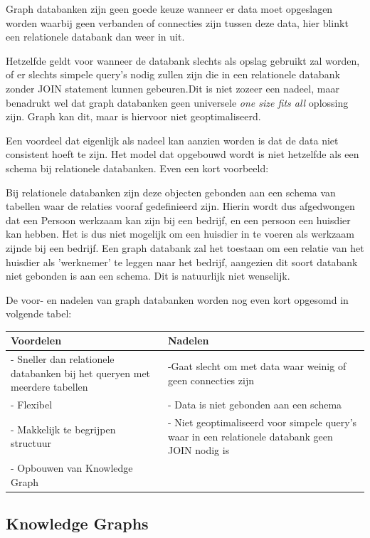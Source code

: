 Graph databanken zijn geen goede keuze wanneer er data moet opgeslagen worden waarbij geen verbanden of connecties zijn tussen deze data, hier blinkt een relationele databank dan weer in uit. 

Hetzelfde geldt voor wanneer de databank slechts als opslag gebruikt zal worden, of er slechts simpele query's nodig zullen zijn die in een relationele databank zonder JOIN statement kunnen gebeuren.Dit is niet zozeer een nadeel, maar benadrukt wel dat graph databanken geen universele \textit{one size fits all} oplossing zijn. Graph kan dit, maar is hiervoor niet geoptimaliseerd.

Een voordeel dat eigenlijk als nadeel kan aanzien worden is dat de data niet consistent hoeft te zijn. Het model dat opgebouwd wordt is niet hetzelfde als een schema bij relationele databanken. Even een kort voorbeeld:

Bij relationele databanken zijn deze objecten gebonden aan een schema van tabellen waar de relaties vooraf gedefinieerd zijn. Hierin wordt dus afgedwongen dat een Persoon werkzaam kan zijn bij een bedrijf, en een persoon een huisdier kan hebben. Het is dus niet mogelijk om een huisdier in te voeren als werkzaam zijnde bij een bedrijf.
Een graph databank zal het toestaan om een relatie van het huisdier als 'werknemer' te leggen naar het bedrijf, aangezien dit soort databank niet gebonden is aan een schema. Dit is natuurlijk niet wenselijk.

De voor- en nadelen van graph databanken worden nog even kort opgesomd in volgende tabel:

\begin{center}
	\begin{tabularx}{\textwidth}{|X|X|}
		\hline
		\textbf{Voordelen} & \textbf{Nadelen}  \\ 
		\hline
		 - Sneller dan relationele databanken bij het queryen met meerdere tabellen & -Gaat slecht om met data waar weinig of geen connecties zijn \\ 
		- Flexibel & - Data is niet gebonden aan een schema \\
		- Makkelijk te begrijpen structuur & - Niet geoptimaliseerd voor simpele query's waar in een relationele databank geen JOIN nodig is \\ 
		- Opbouwen van Knowledge Graph & \\
		\hline
	\end{tabularx}
\end{center}

\subsection{Knowledge Graphs}
\label{sec:Knowledge Graphs}


